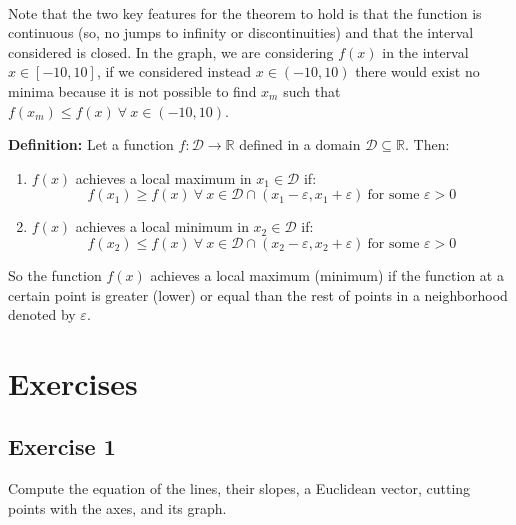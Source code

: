 \documentclass[11pt]{article}
\providecommand{\tightlist}{%
      \setlength{\itemsep}{0pt}\setlength{\parskip}{0pt}}
\begin{document}
    \begin{center}
    \end{center}
    { \hspace*{\fill} \\}
    
    Note that the two key features for the theorem to hold is that the
function is continuous (so, no jumps to infinity or discontinuities) and
that the interval considered is closed. In the graph, we are considering
\(f(x)\) in the interval \(x\in[-10,10]\), if we considered instead
\(x\in(-10,10)\) there would exist no minima because it is not possible
to find \(x_m\) such that \(f(x_m) \leq f(x) \ \forall \ x\in(-10,10)\).

\textbf{Definition:} Let a function
\(f : \mathcal{D}\rightarrow\mathbb{R}\) defined in a domain
\(\mathcal{D}\subseteq\mathbb{R}\). Then:

\begin{enumerate}
\def\labelenumi{\arabic{enumi}.}
\tightlist
\item
  \(f(x)\) achieves a local maximum in \(x_1\in\mathcal{D}\) if: \[
  f(x_1)\geq f(x) \ \forall \ x\in\mathcal{D}\cap(x_1-\varepsilon, x_1 + \varepsilon) \ \text{for some } \varepsilon > 0
  \]
\item
  \(f(x)\) achieves a local minimum in \(x_2\in\mathcal{D}\) if: \[
  f(x_2)\leq f(x) \ \forall \ x\in\mathcal{D}\cap(x_2-\varepsilon, x_2 + \varepsilon) \ \text{for some } \varepsilon > 0
  \]
\end{enumerate}

So the function \(f(x)\) achieves a local maximum (minimum) if the
function at a certain point is greater (lower) or equal than the rest of
points in a neighborhood denoted by \(\varepsilon\).

    \hypertarget{exercises}{%
\section{Exercises}\label{exercises}}

\hypertarget{exercise-1}{%
\subsection{Exercise 1}\label{exercise-1}}

Compute the equation of the lines, their slopes, a Euclidean vector,
cutting points with the axes, and its graph.
\end{document}
